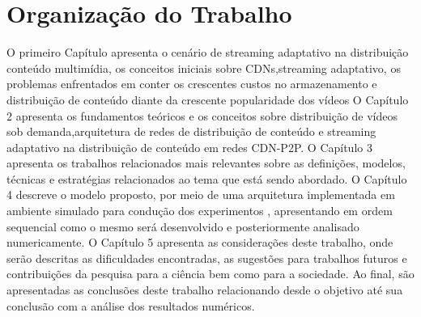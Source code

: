 \documentclass[
	12pt,				%
	oneside,			%
	a4paper,			%
	english,			%
	brazil				%
	]{abntex2ppgsi}
\begin{document}
\section{Organização do Trabalho}

O primeiro Capítulo apresenta o cenário de streaming adaptativo na distribuição conteúdo multimídia, os conceitos iniciais sobre CDNs,streaming adaptativo, os problemas enfrentados em conter os crescentes custos no armazenamento e distribuição de conteúdo diante da crescente popularidade dos vídeos
O Capítulo 2 apresenta os fundamentos teóricos e os conceitos sobre distribuição de vídeos sob demanda,arquitetura de redes de distribuição de conteúdo e streaming adaptativo na distribuição de conteúdo em redes CDN-P2P.
O Capítulo 3 apresenta os trabalhos relacionados mais relevantes sobre as definições, modelos, técnicas e estratégias relacionados ao tema que está sendo abordado. 
O Capítulo 4 descreve o modelo proposto, por meio de uma arquitetura implementada em ambiente simulado para condução dos experimentos , apresentando em ordem sequencial como o mesmo será desenvolvido e posteriormente analisado numericamente.
O Capítulo 5 apresenta as considerações deste trabalho, onde serão descritas as dificuldades encontradas, as sugestões para trabalhos futuros e contribuições da pesquisa para a ciência bem como para a sociedade. Ao final, são apresentadas as conclusões deste trabalho relacionando desde o objetivo até sua conclusão com a análise dos resultados numéricos.



\end{document}

